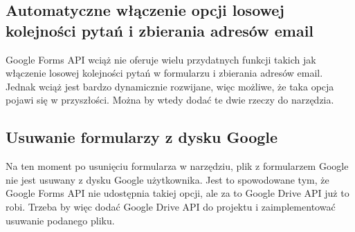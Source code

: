\subsection*{Automatyczne włączenie opcji losowej kolejności pytań i zbierania adresów email}
Google Forms API wciąż nie oferuje wielu przydatnych funkcji takich jak włączenie losowej kolejności 
pytań w formularzu i zbierania adresów email. Jednak wciąż jest bardzo dynamicznie rozwijane, więc
możliwe, że taka opcja pojawi się w przyszłości. Można by wtedy dodać te dwie rzeczy do narzędzia.

\subsection*{Usuwanie formularzy z dysku Google}
Na ten moment po usunięciu formularza w narzędziu, plik z formularzem Google nie jest usuwany
z dysku Google użytkownika. Jest to spowodowane tym, że Google Forms API nie udostępnia takiej opcji,
ale za to Google Drive API już to robi. Trzeba by więc dodać Google Drive API do projektu i
zaimplementować usuwanie podanego pliku.